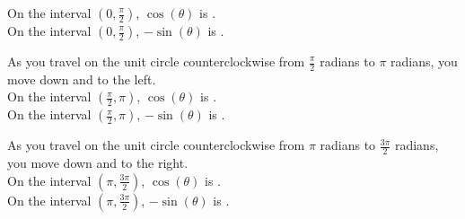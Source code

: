 \documentclass{ximera}
\begin{document}
\begin{example}
\begin{question}
On the interval $\left (0, \frac{\pi}{2} \right)$, $\cos(\theta)$ is . \\


On the interval $\left (0, \frac{\pi}{2} \right)$, $-\sin(\theta)$ is . \\

\end{question}







\begin{question}


As you travel on the unit circle counterclockwise from $\frac{\pi}{2}$ radians to $\pi$ radians, you move down and to the left. \\


On the interval $\left (\frac{\pi}{2}, \pi \right)$, $\cos(\theta)$ is . \\


On the interval $\left (\frac{\pi}{2}, \pi \right)$, $-\sin(\theta)$ is . \\

\end{question}







\begin{question}


As you travel on the unit circle counterclockwise from $\pi$ radians to $\frac{3\pi}{2}$ radians, you move down and to the right. \\


On the interval $\left (\pi, \frac{3\pi}{2} \right)$, $\cos(\theta)$ is . \\


On the interval $\left (\pi, \frac{3\pi}{2} \right)$, $-\sin(\theta)$ is . \\

\end{question}








\begin{question}



\end{question}
\end{example}
\end{document}
